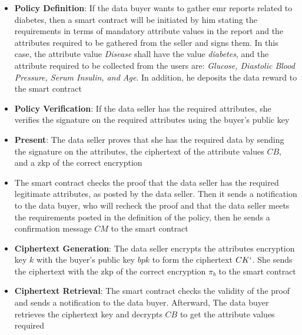 \begin{itemize}
    \item \textbf{Policy Definition}: If the data buyer wants to gather \ac{emr} reports related to diabetes, then a smart contract will be initiated by him stating the requirements in terms of mandatory attribute values in the report and the attributes required to be gathered from the seller and signs them. 
    In this case, the attribute value \textit{Disease} shall have the value \textit{diabetes}, and the attribute required to be collected from the users are: \textit{Glucose, Diastolic Blood Pressure, Serum Insulin, and Age}. 
    In addition, he deposits the data reward to the smart contract
    \item \textbf{Policy Verification}: If the data seller has the required attributes, she verifies the signature on the required attributes using the buyer's public key
    \item \textbf{Present}: The data seller proves that she has the required data by sending the signature on the attributes, the ciphertext of the attribute values $CB$, and a \ac{zkp} of the correct encryption
    \item The smart contract checks the proof that the data seller has the required legitimate attributes, as posted by the data seller. 
    Then it sends a notification to the data buyer, who will recheck the proof and that the data seller meets the requirements posted in the definition of the policy, then he sends a confirmation message $CM$ to the smart contract
    \item \textbf{Ciphertext Generation}: The data seller encrypts the attributes encryption key $k$ with the buyer's public key $bpk$ to form the ciphertext $CK`$. 
    She sends the ciphertext with the \ac{zkp} of the correct encryption $\pi_b$ to the smart contract
    \item \textbf{Ciphertext Retrieval}: The smart contract checks the validity of the proof and sends a notification to the data buyer. 
    Afterward, The data buyer retrieves the ciphertext key and decrypts $CB$ to get the attribute values required
\end{itemize}

